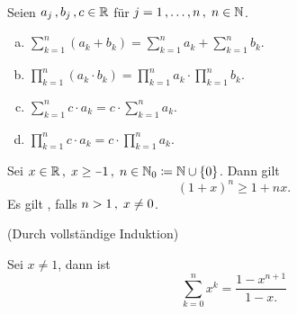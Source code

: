 \documentclass[../ana1.tex]{subfiles}
\begin{document}
\begin{bem}\leavevmode \\
	Seien \(a_{j} \operatorname{,} b_{j} \operatorname{,} c \in \mathbb{R} \) für \(j = 1 \operatorname{,} \ldots \operatorname{,} n \operatorname{,}  \; n \in \mathbb{N} \).
	\begin{enumerate}[(a)]
		\item \(\sum_{k = 1}^{n} (a_{k} + b_{k}) = \sum_{k = 1}^{n} a_{k} + \sum_{k = 1}^{n} b_{k}. \)
		\item \(\prod_{k = 1}^{n} (a_{k} \cdot b_{k}) = \prod_{k = 1}^{n} a_{k} \cdot \prod_{k = 1}^{n} b_{k}. \)
		\item \(\sum_{k = 1}^{n} c \cdot a_{k} = c \cdot \sum_{k = 1}^{n} a_{k}. \)
		\item \(\prod_{k = 1}^{n} c \cdot a_{k} = c \cdot \prod_{k = 1}^{n} a_{k}. \)
	\end{enumerate}
\end{bem}

\begin{satz}\label{satz:bern_ungl}
	Sei \(x \in \R \ko  \; x \geq \minus 1 \ko  \; n \in \N_{0} \coloneqq \N \cup \set{0} \). Dann gilt
	\[{(1 + x)}^{n} \geq 1 + nx. \]
	Es gilt \gqq{\(> \)}, falls \(n>1 \operatorname{,}  \; x \neq 0 \).
\end{satz}
\begin{bew} (Durch vollständige Induktion)
\end{bew}

\begin{satz}\label{satz:geom_sum}
	Sei \(x\neq 1 \), dann ist 
	\[\sum_{k = 0}^{n}{x}^{k} = \frac{1 - x^{n + 1}}{1 - x.} \]
\end{satz}

\iftoggle{short}{}{\newpage}%
\end{document}
